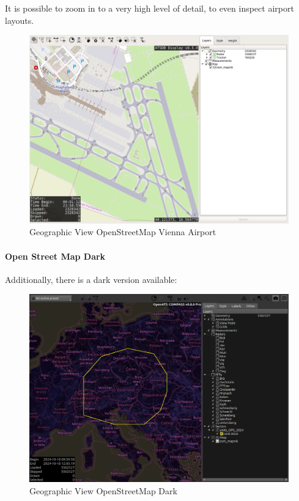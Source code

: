It is possible to zoom in to a very high level of detail, to even inspect airport layouts.

\begin{figure}[H]
    \hspace*{-2.5cm}
    \includegraphics[width=19cm,frame]{figures/geoview_osm_vienna.png}
  \caption{Geographic View OpenStreetMap Vienna Airport}
\end{figure}

\newpage
\paragraph{Open Street Map Dark}
\label{ref:geoview_map_osm_dark}

Additionally, there is a dark version available:
\begin{figure}[H]
    \hspace*{-2.5cm}
    \includegraphics[width=19cm,frame]{figures/geoview_osm_dark.png}
  \caption{Geographic View OpenStreetMap Dark}
\end{figure}

